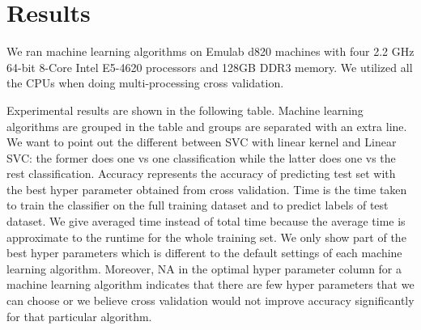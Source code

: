 \section{Results}
We ran machine learning algorithms on Emulab d820 machines with four 2.2 GHz 64-bit 8-Core Intel E5-4620 processors and 128GB DDR3 memory. We utilized all the CPUs when doing multi-processing cross validation.

Experimental results are shown in the following table. Machine learning algorithms are grouped in the table and groups are separated with an extra line. We want to point out the different between SVC with linear kernel and Linear SVC: the former does one vs one classification while the latter does one vs the rest classification. Accuracy represents the accuracy of predicting test set with the best hyper parameter obtained from cross validation. Time is the time taken to train the classifier on the full training dataset and to predict labels of test dataset. We give averaged time instead of total time because the average time is approximate to the runtime for the whole training set. We only show part of the best hyper parameters which is different to the default settings of each machine learning algorithm. Moreover, NA in the optimal hyper parameter column for a machine learning algorithm indicates that there are few hyper parameters that we can choose or we believe cross validation would not improve accuracy significantly for that particular algorithm.

